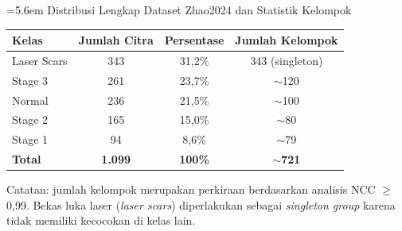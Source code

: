 \clearpage


\label{lamp:dataset}

\noindent\hangindent=5.6em
%
Distribusi Lengkap Dataset Zhao2024 dan Statistik Kelompok

\vspace{4pt}

\noindent
\begin{tabular}{l c c c}
  \toprule
  \textbf{Kelas} & \textbf{Jumlah Citra} & \textbf{Persentase} & \textbf{Jumlah Kelompok} \\
  \midrule
  Laser Scars & 343 & 31,2\%  & 343 (singleton) \\
  Stage 3     & 261 & 23,7\%  & $\sim$120 \\
  Normal      & 236 & 21,5\%  & $\sim$100 \\
  Stage 2     & 165 & 15,0\%  & $\sim$80 \\
  Stage 1     & 94  &  8,6\%  & $\sim$79 \\
  \midrule
  \textbf{Total} & \textbf{1.099} & \textbf{100\%} & \textbf{$\sim$721} \\
  \bottomrule
\end{tabular}

\vspace{6pt}
\noindent Catatan: jumlah kelompok merupakan perkiraan berdasarkan analisis NCC $\geq$ 0,99.
Bekas luka laser (\textit{laser scars}) diperlakukan sebagai \textit{singleton group} karena
tidak memiliki kecocokan di kelas lain.
